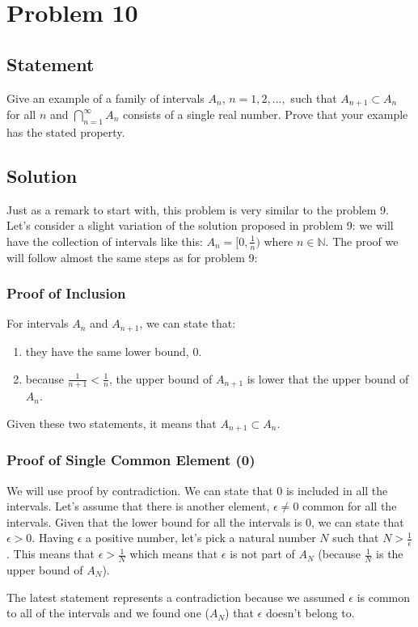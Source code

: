 \documentclass[12pt,letter]{memoir}
\begin{document}
\chapter{Problem 10}
\section*{Statement}
Give an example of a family of intervals $A_n$, $n=1,2,\dots,$ such that $A_{n+1} \subset A_n$ for all $n$ and $\bigcap\limits_{n=1}^{\infty}A_n$ consists of a single real number. Prove that your example has the stated property.
\section*{Solution}
Just as a remark to start with, this problem is very similar to the problem 9. Let's consider a slight variation of the solution proposed in problem 9: we will have the collection of intervals like this: $A_n=[0, \frac{1}{n})$ where $n \in \mathbb{N}$. The proof we will follow almost the same steps as for problem 9:
\subsection*{Proof of Inclusion}
For intervals $A_n$ and $A_{n+1}$, we can state that:\noprelistbreak
\begin{enumerate}
\item they have the same lower bound, $0$.
\item because $\frac{1}{n+1}<\frac{1}{n}$, the upper bound of $A_{n+1}$ is lower that the upper bound of $A_n$.
\end{enumerate}
Given these two statements, it means that $A_{n+1} \subset A_n$.
\subsection*{Proof of Single Common Element (0)}
We will use proof by contradiction. We can state that $0$ is included in all the intervals. Let's assume that there is another element, $\epsilon \neq 0 $ common for all the intervals.
Given that the lower bound for all the intervals is $0$, we can state that $\epsilon > 0$. Having $\epsilon$ a positive number, let's pick a natural number $N$ such that $N>\frac{1}{\epsilon}$. This means that $\epsilon>\frac{1}{N}$ which means that $\epsilon$ is not part of $A_N$ (because $\frac{1}{N}$ is the upper bound of $A_N$).\

The latest statement represents a contradiction because we assumed $\epsilon$ is common to all of the intervals and we found one ($A_N$) that $\epsilon$ doesn't belong to.
\end{document}
